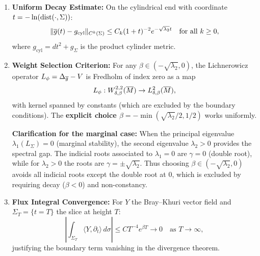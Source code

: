 \begin{theorem}
\begin{enumerate}
    \item \textbf{Uniform Decay Estimate:} On the cylindrical end with coordinate $t = -\ln(\mathrm{dist}(\cdot, \Sigma))$:
    \begin{equation}\label{eq:UniformDecay}
        \|\overline{g}(t) - g_{\text{cyl}}\|_{C^k(\Sigma)} \le C_k (1+t)^{-2} e^{-\sqrt{\lambda_2} t} \quad \text{for all } k \ge 0,
    \end{equation}
    where $g_{\text{cyl}} = dt^2 + g_\Sigma$ is the product cylinder metric.
    
    \item \textbf{Weight Selection Criterion:} For any $\beta \in (-\sqrt{\lambda_2}, 0)$, the Lichnerowicz operator $L_\phi = \Delta_{\overline{g}} - V$ is Fredholm of index zero as a map
    \begin{equation}
        L_\phi: W^{2,2}_{\delta, \beta}(\overline{M}) \to L^2_{\delta, \beta}(\overline{M}),
    \end{equation}
    with kernel spanned by constants (which are excluded by the boundary conditions). The \textbf{explicit choice $\beta = -\min(\sqrt{\lambda_2}/2, 1/2)$} works uniformly.
    
    \textbf{Clarification for the marginal case:} When the principal eigenvalue $\lambda_1(L_\Sigma) = 0$ (marginal stability), the second eigenvalue $\lambda_2 > 0$ provides the spectral gap. The indicial roots associated to $\lambda_1 = 0$ are $\gamma = 0$ (double root), while for $\lambda_2 > 0$ the roots are $\gamma = \pm\sqrt{\lambda_2}$. Thus choosing $\beta \in (-\sqrt{\lambda_2}, 0)$ avoids all indicial roots except the double root at $0$, which is excluded by requiring decay ($\beta < 0$) and non-constancy.
    
    \item \textbf{Flux Integral Convergence:} For $Y$ the Bray--Khuri vector field and $\Sigma_T = \{t = T\}$ the slice at height $T$:
    \begin{equation}
        \left| \int_{\Sigma_T} \langle Y, \partial_t \rangle \, d\sigma \right| \le C T^{-4} e^{\beta T} \to 0 \quad \text{as } T \to \infty,
    \end{equation}
    justifying the boundary term vanishing in the divergence theorem.
\end{enumerate}
\end{theorem}

